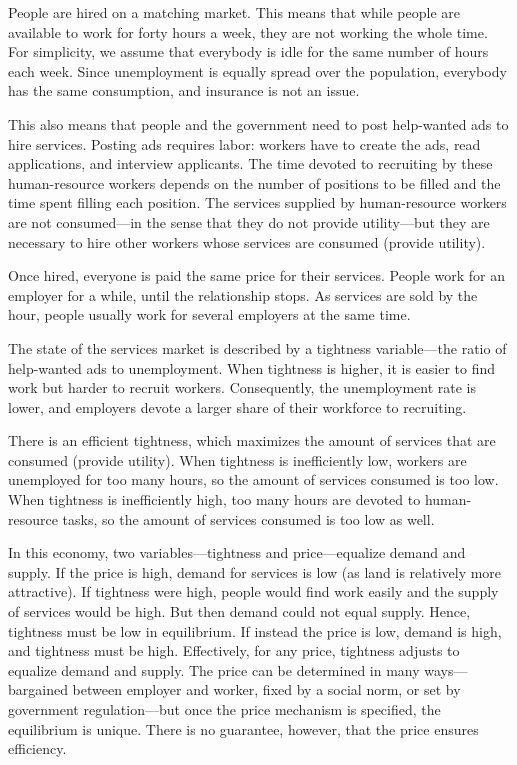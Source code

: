 \documentclass[letterpaper,12pt,leqno]{article}
\begin{document}
\begin{bibunit}
People are hired on a matching market. This means that while people are available to work for forty hours a week, they are  not working the whole time. For simplicity, we assume that everybody is idle for the same number of hours each week. Since unemployment is equally spread over the population, everybody has the same consumption, and insurance is not an issue.

This also means that people and the government need to post help-wanted ads to hire services. Posting ads requires labor: workers have to create the ads, read applications, and interview applicants. The time devoted to recruiting by these human-resource workers depends on the number of positions to be filled and the time spent filling each position. The services supplied by human-resource workers are not consumed---in the sense that they do not provide utility---but they are necessary to hire other workers whose services are consumed (provide utility).

Once hired, everyone is paid the same price for their services. People work for an employer for a while, until the relationship stops. As services are sold by the hour, people usually work for several employers at the same time.

The state of the services market is described by a tightness variable---the ratio of help-wanted ads to unemployment. When tightness is higher, it is easier to find work but harder to recruit workers. Consequently, the unemployment rate is lower, and employers devote a larger share of their workforce to recruiting. 

There is an efficient tightness, which maximizes the amount of services that are consumed (provide utility). When tightness is inefficiently low, workers are unemployed for too many hours, so the amount of services consumed is too low. When tightness is inefficiently high, too many hours are devoted to human-resource tasks, so the amount of services consumed is too low as well.

In this economy, two variables---tightness and price---equalize demand and supply. If the price is high, demand for services is low (as land is relatively more attractive). If tightness were high, people would find work easily and the supply of services would be high. But then demand could not equal supply. Hence, tightness must be low in equilibrium. If instead the price is low, demand is high, and tightness must be high. Effectively, for any price, tightness adjusts to equalize demand and supply. The price can be determined in many ways---bargained between employer and worker, fixed by a social norm, or set by government regulation---but once the price mechanism is specified, the equilibrium is unique. There is no guarantee, however, that the price ensures efficiency.


\end{bibunit}
\end{document}
